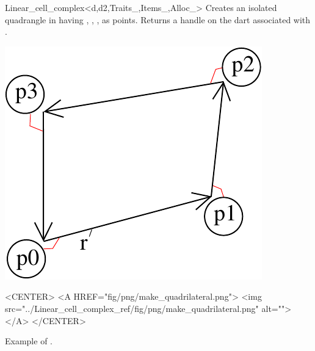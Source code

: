 \begin{ccRefClass}{Linear_cell_complex<d,d2,Traits_,Items_,Alloc_>}
{Creates an isolated quadrangle in   having , , 
  ,  as points.
   Returns a handle on the dart associated with .
}
%
\def\LargFig{.3\textwidth}
  \begin{ccTexOnly}
    \begin{center}
      \includegraphics[width=\LargFig]{Linear_cell_complex_ref/fig/pdf/make_quadrilateral}
    \end{center}
  \end{ccTexOnly}
  \begin{ccHtmlOnly}
    <CENTER>
    <A HREF="fig/png/make_quadrilateral.png">
        <img src="../Linear_cell_complex_ref/fig/png/make_quadrilateral.png" alt=""></A>
    </CENTER>
    \end{ccHtmlOnly}
    \centerline{Example of .}


\end{ccRefClass}
